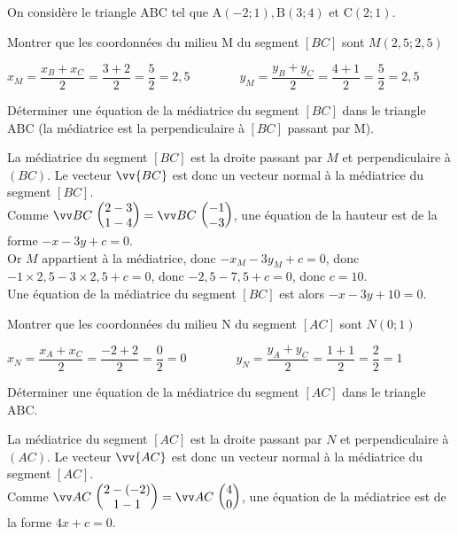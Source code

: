 \documentclass[12pt,a4paper]{article}  %
\begin{document}
On considère le triangle $\mathrm{ABC}$ tel que $\mathrm{A}(-2 ;1), \mathrm{B}(3 ; 4)$ et $\mathrm{C}(2 ; 1)$.
\begin{enumMet}
    \item Montrer que les coordonnées du milieu M du segment $[BC]$ sont $M(2,5;2,5)$\\
    \begin{corrBox}
        $x_M=\dfrac{x_B+x_C}{2}=\dfrac{3+2}{2}=\dfrac{5}{2}=2,5\quad \quad \quad \quad y_M=\dfrac{y_B+y_C}{2}=\dfrac{4+1}{2}=\dfrac{5}{2}=2,5$
    \end{corrBox}
    \item Déterminer une équation de la médiatrice  du segment $[BC]$ dans le triangle $\mathrm{ABC}$ (la médiatrice est la perpendiculaire à $[BC]$ passant par M).\\
    \begin{corrBox}
        La médiatrice du segment $[BC]$ est la droite passant par $M$ et perpendiculaire à $(BC)$. Le vecteur $\vv{BC}$ est donc un vecteur normal à la médiatrice du segment $[BC]$.\\
        Comme $\Coord{BC}{2-3}{1-4}=\Coord{BC}{-1}{-3}$, une équation de la hauteur est de la forme $-x-3y+c=0$.\\
        Or $M$ appartient à la médiatrice, donc $-x_{M}-3y_{M}+c=0$, donc $-1\times 2,5-3\times2,5+c=0$, donc $-2,5-7,5+c=0$, donc $c=10$.\\
        Une équation de la médiatrice du segment $[BC]$ est alors $-x-3y+10=0$.
    \end{corrBox}
    \item Montrer que les coordonnées du milieu N du segment $[AC]$ sont $N(0;1)$\\
    \begin{corrBox}
        $x_N=\dfrac{x_A+x_C}{2}=\dfrac{-2+2}{2}=\dfrac{0}{2}=0\quad \quad \quad \quad y_N=\dfrac{y_A+y_C}{2}=\dfrac{1+1}{2}=\dfrac{2}{2}=1$
    \end{corrBox}
    \item Déterminer une équation de la médiatrice  du segment $[AC]$ dans le triangle $\mathrm{ABC}$.\\
    \begin{corrBox}
        La médiatrice du segment $[AC]$ est la droite passant par $N$ et perpendiculaire à $(A C)$. Le vecteur $\vv{A C}$ est donc un vecteur normal à la médiatrice du segment $[AC]$.\\
        Comme $\Coord{AC}{2-(-2)}{1-1}=\Coord{AC}{4}{0}$, une équation de la médiatrice est de la forme $4x+c=0$.\\

\end{corrBox}
\end{enumMet}
\end{document}
